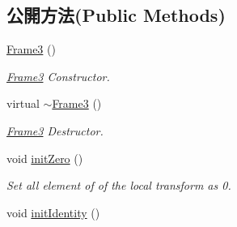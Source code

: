 \subsection*{公開方法(Public Methods)}
\begin{DoxyCompactItemize}
\item 
\hyperlink{class_magnum_1_1_frame3_ae7f38781fa19c34297fbf6ef5f7cb2c7}{Frame3} ()
\begin{DoxyCompactList}\small\item\em \hyperlink{class_magnum_1_1_frame3}{Frame3} Constructor. \end{DoxyCompactList}\item 
virtual \hyperlink{class_magnum_1_1_frame3_a26fdcbf96d3cf66c6a0724399225e10c}{$\sim$\+Frame3} ()
\begin{DoxyCompactList}\small\item\em \hyperlink{class_magnum_1_1_frame3}{Frame3} Destructor. \end{DoxyCompactList}\item 
void \hyperlink{class_magnum_1_1_frame3_aa04db3ec07bc5ee51f3a09bfd32b7d5a}{init\+Zero} ()\hypertarget{class_magnum_1_1_frame3_aa04db3ec07bc5ee51f3a09bfd32b7d5a}{}\label{class_magnum_1_1_frame3_aa04db3ec07bc5ee51f3a09bfd32b7d5a}

\begin{DoxyCompactList}\small\item\em Set all element of of the local transform as 0. \end{DoxyCompactList}\item 
void \hyperlink{class_magnum_1_1_frame3_a8a7801ff40fd85a8126ff034a4f369df}{init\+Identity} ()\hypertarget{class_magnum_1_1_frame3_a8a7801ff40fd85a8126ff034a4f369df}{}\label{class_magnum_1_1_frame3_a8a7801ff40fd85a8126ff034a4f369df}


\end{DoxyCompactItemize}
